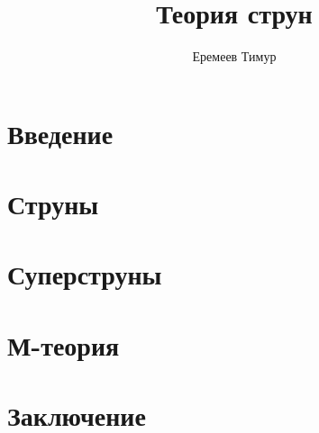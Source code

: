 \documentclass[a4paper 12pt]{article}
\title{Теория струн}
\author{Еремеев Тимур}
\begin{document}
    \maketitle

    \section*{Введение}
    

    \section*{Струны}
    

    \section*{Суперструны}
    

    \section*{М-теория}
    

    \section*{Заключение}
    
\end{document}
